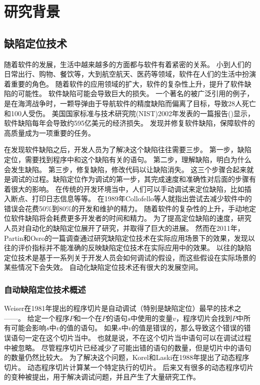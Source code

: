 \chapter{研究背景}

\section{缺陷定位技术}

随着软件的发展，生活中越来越多的方面都与软件有着紧密的关系。
小到人们的日常出行、购物、餐饮等，大到航空航天、医药等领域，软件在人们的生活中扮演着重要的角色。
随着软件的应用领域的扩大，软件的复杂性上升，提升了软件缺陷的可能性。
软件缺陷可能会导致巨大的损失。
一个著名的被广泛引用的例子，是在海湾战争时，一颗导弹由于导航软件的精度缺陷而偏离了目标，导致28人死亡和100人受伤。
美国国家标准与技术研究院(NIST)2002年发表的一篇报告()显示，软件缺陷每年会导致约595亿美元的经济损失。
发现并修复软件缺陷，保障软件的高质量成为一项重要的任务。

在发现软件缺陷之后，开发人员为了解决这个缺陷往往需要三步\parencite{Parnin2011Are}。
第一步，缺陷定位，需要找到程序中和这个缺陷有关的语句。
第二步，理解缺陷，明白为什么会发生缺陷。
第三步，修复缺陷，修改代码以让缺陷消失。
这三个步骤合起来就是调试的过程。缺陷定位作为调试的第一步，其完成速度和准确性对后面的步骤有着很大的影响。
在传统的开发环境当中，人们可以手动调试来定位缺陷，比如插入断点、打印日志信息等等。
在1989年Collofello等人就指出尝试去减少软件中的错误会花费50\%到80\%的开发和维护的精力\parencite{Collofello1989Evaluating}。
随着软件的复杂性的上升，手动地定位软件缺陷将会耗费更多开发者的时间和精力。
为了提高定位缺陷的速度，研究人员对自动化的缺陷定位展开了研究，并取得了巨大的进展。
然而在2011年，Partin和Osro的一篇调查\parencite{Parnin2011Are}通过研究缺陷定位技术在实际应用场景下的效果，发现以往的评价指标并不能准确的反映缺陷定位技术在实际应用中的效果。
以往的缺陷定位技术是基于一系列关于开发人员会如何调试的假设，而这些假设在实际场景的某些情况下会失效。
自动化缺陷定位技术还有很大的发展空间。

\subsection{自动缺陷定位技术概述}

Weiser在1981年提出的程序切片\parencite{Weiser1981Program,Weiser1984Program}是自动调试（特别是缺陷定位）最早的技术之——。
给定一个程序$P$和一个在$P$的语句$s$中使用的变量$v$，程序切片会找到$P$中所有可能会影响$s$中$v$的值的语句。
如果$s$中$v$的值是错误的，那么导致这个错误的错误语句一定在这个切片当中。
也就是说，不在这个切片当中语句可以在调试过程中被忽略。
尽管程序切片已经减少了可能出错的语句的数量，但是切片中的语句的数量仍然比较大。
为了解决这个问题，Korel和Laski在1988年提出了动态程序切片\parencite{Korel1988Dynamic}。
动态程序切片计算某一个特定执行的切片。
后来又有很多的动态程序切片的变种被提出\parencite{Demillo1996Critical,Gyim1999An,Zhang2006Pruning,Zhang2003Precise}，用于解决调试问题，并且产生了大量研究工作\parencite{Agrawal1993Debugging,Liu2007Indexing,Al2005The,Alves2011Fault,Ju2014HSFal,Wotawa2010Fault,Mao2014Slice}。

